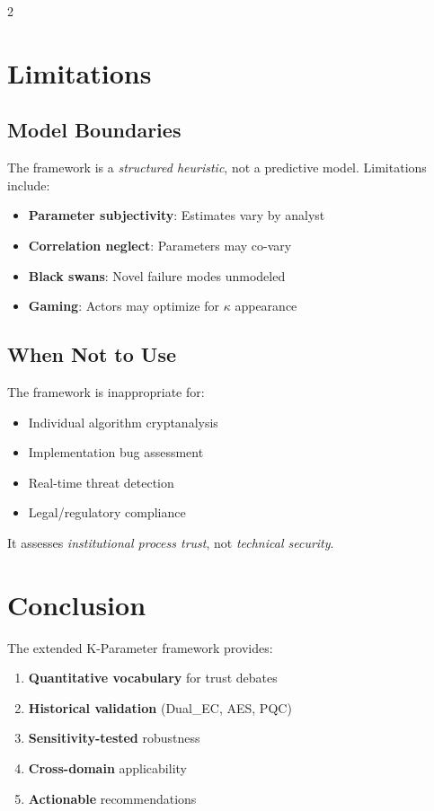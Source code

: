\documentclass[11pt]{article}
\begin{document}
\begin{multicols}{2}
\section{Limitations}

\subsection{Model Boundaries}

The framework is a \textit{structured heuristic}, not a predictive model. Limitations include:

\begin{itemize}[noitemsep]
\item \textbf{Parameter subjectivity}: Estimates vary by analyst
\item \textbf{Correlation neglect}: Parameters may co-vary
\item \textbf{Black swans}: Novel failure modes unmodeled
\item \textbf{Gaming}: Actors may optimize for $\kappa$ appearance
\end{itemize}

\subsection{When Not to Use}

The framework is inappropriate for:
\begin{itemize}[noitemsep]
\item Individual algorithm cryptanalysis
\item Implementation bug assessment
\item Real-time threat detection
\item Legal/regulatory compliance
\end{itemize}

It assesses \textit{institutional process trust}, not \textit{technical security}.

\section{Conclusion}

The extended K-Parameter framework provides:

\begin{enumerate}[noitemsep]
\item \textbf{Quantitative vocabulary} for trust debates
\item \textbf{Historical validation} (Dual\_EC, AES, PQC)
\item \textbf{Sensitivity-tested} robustness
\item \textbf{Cross-domain} applicability
\item \textbf{Actionable} recommendations
\end{enumerate}


\end{multicols}
\end{document}
